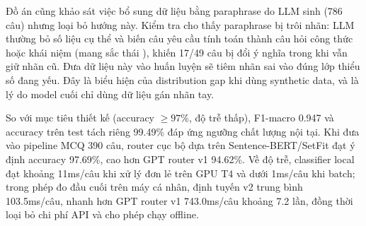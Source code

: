 \documentclass[../DoAn.tex]{subfiles}
\begin{document}
\begin{table}[H]
    \centering
    \caption{So sánh bộ định tuyến v1 (GPT) và v2 (Sentence-BERT/SetFit)}
    \label{tab:intent-results}
    {\small
    \setlength{\tabcolsep}{4pt}
    }
\end{table}

Đồ án cũng khảo sát việc bổ sung dữ liệu bằng paraphrase do LLM sinh (786 câu) nhưng loại bỏ hướng này. Kiểm tra cho thấy paraphrase bị trôi nhãn: LLM thường bỏ số liệu cụ thể và biến câu yêu cầu tính toán thành câu hỏi công thức hoặc khái niệm (mang sắc thái ), khiến 17/49 câu  bị đổi ý nghĩa trong khi vẫn giữ nhãn cũ. Đưa dữ liệu này vào huấn luyện sẽ tiêm nhãn sai vào đúng lớp thiểu số đang yếu. Đây là biểu hiện của distribution gap khi dùng synthetic data, và là lý do model cuối chỉ dùng dữ liệu gán nhãn tay.

So với mục tiêu thiết kế (accuracy $\geq 97\%$, độ trễ thấp), F1-macro 0.947 và accuracy trên test tách riêng 99.49\% đáp ứng ngưỡng chất lượng nội tại. Khi đưa vào pipeline MCQ 390 câu, router cục bộ dựa trên Sentence-BERT/SetFit đạt ý định accuracy 97.69\%, cao hơn GPT router v1 94.62\%. Về độ trễ, classifier local đạt khoảng 11ms/câu khi xử lý đơn lẻ trên GPU T4 và dưới 1ms/câu khi batch; trong phép đo đầu cuối trên máy cá nhân, định tuyến v2 trung bình 103.5ms/câu, nhanh hơn GPT router v1 743.0ms/câu khoảng 7.2 lần, đồng thời loại bỏ chi phí API và cho phép chạy offline.
\end{document}
